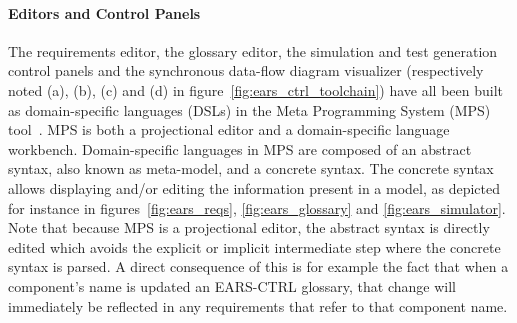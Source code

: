 \paragraph{\textbf{Editors and Control Panels}\\} 
\hspace{-.2cm}
The requirements editor, the glossary editor, the simulation and
test generation control panels and the synchronous data-flow diagram visualizer
(respectively noted (\textsf{a}), (\textsf{b}), (\textsf{c}) and (\textsf{d}) in figure~\ref{fig:ears_ctrl_toolchain}) have all been built as 
domain-specific languages (DSLs) in the Meta Programming System (MPS)
tool~\cite{mps}.
MPS is both a projectional editor and a domain-specific language workbench.
Domain-specific languages in MPS are composed of an abstract syntax, also known
as meta-model, and a concrete syntax. The concrete syntax allows displaying
and/or editing the information present in a model, as depicted for instance in
figures~\ref{fig:ears_reqs}, \ref{fig:ears_glossary} and 
\ref{fig:ears_simulator}. Note that because MPS is a projectional editor, the
abstract syntax is directly edited which avoids the explicit or implicit
intermediate step where the concrete syntax is parsed.
A direct consequence of this is for example the fact that when a component's
name is updated an \textsf{EARS-CTRL} glossary, that change will immediately be
reflected in any requirements that refer to that component name.\vspace{-.4cm} 
